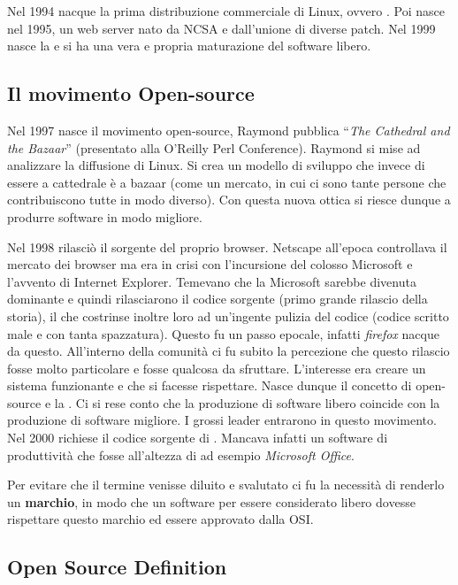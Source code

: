 Nel 1994 nacque la prima distribuzione commerciale di Linux, ovvero . Poi nasce  nel 1995, un web server nato da NCSA e dall'unione di diverse patch. Nel 1999 nasce la  e si ha una vera e propria maturazione del software libero.

\subsection{Il movimento Open-source}

Nel 1997 nasce il movimento open-source, Raymond pubblica ``\textit{The Cathedral and the Bazaar}'' (presentato alla O'Reilly Perl Conference). Raymond si mise ad analizzare la diffusione di Linux. Si crea un modello di sviluppo che invece di essere a cattedrale è a bazaar (come un mercato, in cui ci sono tante persone che contribuiscono tutte in modo diverso). Con questa nuova ottica si riesce dunque a produrre software in modo migliore.

Nel 1998  rilasciò il sorgente del proprio browser. Netscape all'epoca controllava il mercato dei browser ma era in crisi con l'incursione del colosso Microsoft e l'avvento di Internet Explorer. Temevano che la Microsoft sarebbe divenuta dominante e quindi rilasciarono il codice sorgente (primo grande rilascio della storia), il che costrinse inoltre loro ad un'ingente pulizia del codice (codice scritto male e con tanta spazzatura). Questo fu un passo epocale, infatti \textit{firefox} nacque da questo. All'interno della comunità ci fu subito la percezione che questo rilascio fosse molto particolare e fosse qualcosa da sfruttare. L'interesse era creare un sistema funzionante e che si facesse rispettare. Nasce dunque il concetto di open-source e la . Ci si rese conto che la produzione di software libero coincide con la produzione di software migliore. I grossi leader entrarono in questo movimento. Nel 2000  richiese il codice sorgente di . Mancava infatti un software di produttività che fosse all'altezza di ad esempio \textit{Microsoft Office}.

Per evitare che il termine venisse diluito e svalutato ci fu la necessità di renderlo un \textbf{marchio}, in modo che un software per essere considerato libero dovesse rispettare questo marchio ed essere approvato dalla OSI. 

\subsection{Open Source Definition}

